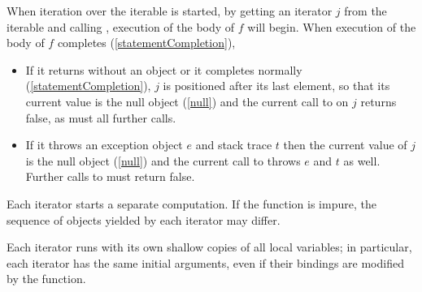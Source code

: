 \documentclass[makeidx]{article}
\begin{document}
{\LMHash{}%
When iteration over the iterable is started, by getting
an iterator $j$ from the iterable and calling ,
execution of the body of $f$ will begin.
When execution of the body of $f$ completes (\ref{statementCompletion}),

\begin{itemize}
\item If it returns without an object or it completes normally
  (\ref{statementCompletion}),
  $j$ is positioned after its last element,
  so that its current value is the null object
  (\ref{null})
  and the current call to  on $j$ returns false,
  as must all further calls.
\item If it throws an exception object $e$ and stack trace $t$
  then the current value of $j$ is the null object
  (\ref{null})
  and the current call to  throws $e$ and $t$ as well.
  Further calls to  must return false.
\end{itemize}

\LMHash{}%
Each iterator starts a separate computation.
If the \code{\SYNC*} function is impure,
the sequence of objects yielded by each iterator may differ.


\LMHash{}%
Each iterator runs with its own shallow copies of all local variables;
in particular, each iterator has the same initial arguments,
even if their bindings are modified by the function.

}
\end{document}
